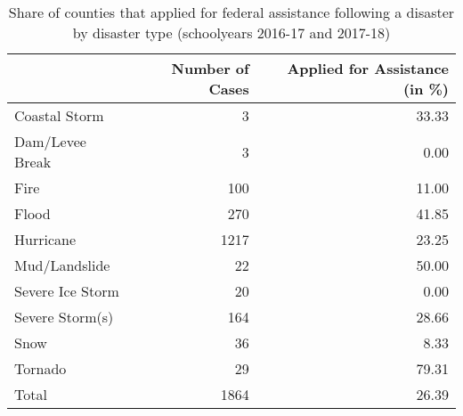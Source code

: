 \begin{table}

\caption{\label{tab:AppsByType}Share of counties that applied for federal assistance following a disaster by disaster type (schoolyears 2016-17 and 2017-18)}
\centering
\begin{tabular}[t]{lrr}
\toprule
  & Number of Cases & Applied for Assistance (in \%)\\
\midrule
Coastal Storm & 3 & 33.33\\
Dam/Levee Break & 3 & 0.00\\
Fire & 100 & 11.00\\
Flood & 270 & 41.85\\
Hurricane & 1217 & 23.25\\
Mud/Landslide & 22 & 50.00\\
Severe Ice Storm & 20 & 0.00\\
Severe Storm(s) & 164 & 28.66\\
Snow & 36 & 8.33\\
Tornado & 29 & 79.31\\
\addlinespace
Total & 1864 & 26.39\\
\bottomrule
\end{tabular}
\end{table}
